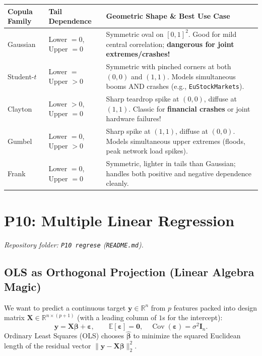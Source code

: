 \documentclass[11pt, a4paper]{article}
\begin{document}
\begin{table}[h!]
\centering
\small
\begin{tabularx}{\textwidth}{>{\raggedright\arraybackslash}p{2.7cm} >{\raggedright\arraybackslash}p{3.0cm} >{\raggedright\arraybackslash}X}
\toprule
\textbf{Copula Family} & \textbf{Tail Dependence} & \textbf{Geometric Shape \& Best Use Case} \\
\midrule
Gaussian & Lower $= 0$, Upper $= 0$ & Symmetric oval on $[0,1]^2$. Good for mild central correlation; \textbf{dangerous for joint extremes/crashes!} \\
Student-$t$ & Lower $=$ Upper $> 0$ & Symmetric with pinched corners at both $(0,0)$ and $(1,1)$. Models simultaneous booms AND crashes (e.g., \texttt{EuStockMarkets}). \\
Clayton & Lower $> 0$, Upper $= 0$ & Sharp teardrop spike at $(0,0)$, diffuse at $(1,1)$. Classic for \textbf{financial crashes} or joint hardware failures! \\
Gumbel & Lower $= 0$, Upper $> 0$ & Sharp spike at $(1,1)$, diffuse at $(0,0)$. Models simultaneous upper extremes (floods, peak network load spikes). \\
Frank & Lower $= 0$, Upper $= 0$ & Symmetric, lighter in tails than Gaussian; handles both positive and negative dependence cleanly. \\
\bottomrule
\end{tabularx}
\end{table}

\section{P10: Multiple Linear Regression}
\emph{Repository folder: \texttt{P10 regrese} (\texttt{README.md}).}

\subsection{OLS as Orthogonal Projection (Linear Algebra Magic)}
We want to predict a continuous target $\mathbf{y} \in \mathbb{R}^n$ from $p$ features packed into design matrix $\mathbf{X} \in \mathbb{R}^{n \times (p+1)}$ (with a leading column of $1$s for the intercept):
\[
    \mathbf{y} = \mathbf{X}\boldsymbol{\beta} + \boldsymbol{\varepsilon}, \qquad \mathbb{E}[\boldsymbol{\varepsilon}] = \mathbf{0},\quad \operatorname{Cov}(\boldsymbol{\varepsilon}) = \sigma^2 \mathbf{I}_n.
\]
Ordinary Least Squares (OLS) chooses $\hat{\boldsymbol{\beta}}$ to minimize the squared Euclidean length of the residual vector $\|\mathbf{y} - \mathbf{X}\boldsymbol{\beta}\|_2^2$.
\end{document}
